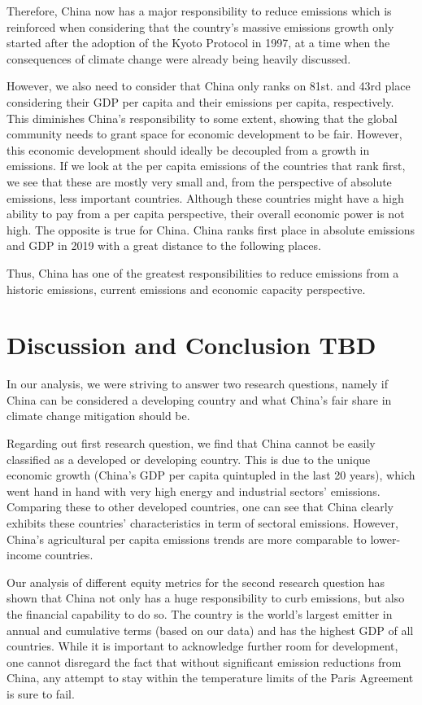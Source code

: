 \documentclass[
  12pt,
]{article}
\numberwithin{equation}{section}
\numberwithin{table}{section}
\numberwithin{figure}{section}
\begin{document}
Therefore, China now has a major responsibility to reduce emissions
which is reinforced when considering that the country's massive
emissions growth only started after the adoption of the Kyoto Protocol
in 1997, at a time when the consequences of climate change were already
being heavily discussed.

However, we also need to consider that China only ranks on 81st. and
43rd place considering their GDP per capita and their emissions per
capita, respectively. This diminishes China's responsibility to some
extent, showing that the global community needs to grant space for
economic development to be fair. However, this economic development
should ideally be decoupled from a growth in emissions. If we look at
the per capita emissions of the countries that rank first, we see that
these are mostly very small and, from the perspective of absolute
emissions, less important countries. Although these countries might have
a high ability to pay from a per capita perspective, their overall
economic power is not high. The opposite is true for China. China ranks
first place in absolute emissions and GDP in 2019 with a great distance
to the following places.

Thus, China has one of the greatest responsibilities to reduce emissions
from a historic emissions, current emissions and economic capacity
perspective.

\hypertarget{discussion-and-conclusion-tbd}{%
\section{Discussion and Conclusion
TBD}\label{discussion-and-conclusion-tbd}}

In our analysis, we were striving to answer two research questions,
namely if China can be considered a developing country and what China's
fair share in climate change mitigation should be.

Regarding out first research question, we find that China cannot be
easily classified as a developed or developing country. This is due to
the unique economic growth (China's GDP per capita quintupled in the
last 20 years), which went hand in hand with very high energy and
industrial sectors' emissions. Comparing these to other developed
countries, one can see that China clearly exhibits these countries'
characteristics in term of sectoral emissions. However, China's
agricultural per capita emissions trends are more comparable to
lower-income countries.

Our analysis of different equity metrics for the second research
question has shown that China not only has a huge responsibility to curb
emissions, but also the financial capability to do so. The country is
the world's largest emitter in annual and cumulative terms (based on our
data) and has the highest GDP of all countries. While it is important to
acknowledge further room for development, one cannot disregard the fact
that without significant emission reductions from China, any attempt to
stay within the temperature limits of the Paris Agreement is sure to
fail.
\end{document}
